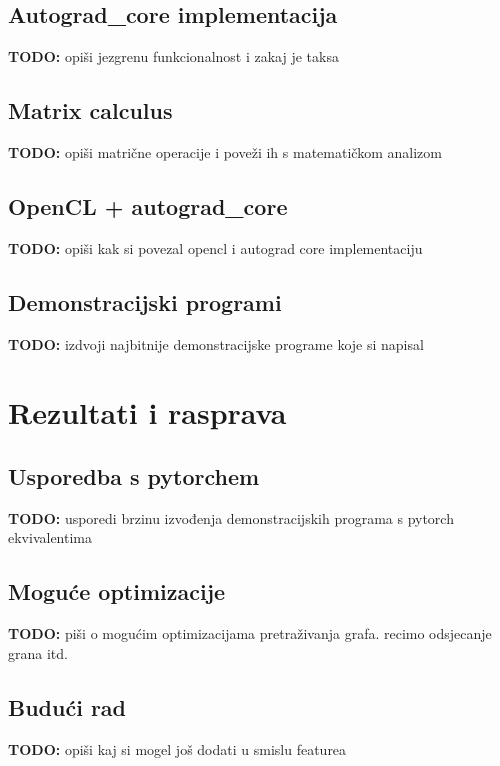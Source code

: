 \documentclass[zavrsnirad]{fer}
\begin{document}
\section{Autograd\_core implementacija}
\textbf{TODO:} opiši jezgrenu funkcionalnost i zakaj je taksa
\blindtext

\pagebreak
\section{Matrix calculus}
\textbf{TODO:} opiši matrične operacije i poveži ih s matematičkom analizom
\blindtext

\pagebreak
\section{OpenCL + autograd\_core}
\textbf{TODO:} opiši kak si povezal opencl i autograd core implementaciju
\blindtext

\pagebreak
\section{Demonstracijski programi}
\textbf{TODO:} izdvoji najbitnije demonstracijske programe koje si napisal
\blindtext

\chapter{Rezultati i rasprava}
\label{pog:rezultati_i_rasprava}

\section{Usporedba s pytorchem}
\textbf{TODO:} usporedi brzinu izvođenja demonstracijskih programa s pytorch ekvivalentima
\blindtext

\pagebreak
\section{Moguće optimizacije}
\textbf{TODO:} piši o mogućim optimizacijama pretraživanja grafa. recimo odsjecanje grana itd.
\blindtext

\pagebreak
\section{Budući rad}
\textbf{TODO:} opiši kaj si mogel još dodati u smislu featurea
\cite{123DCatch}
\blindtext
\end{document}
